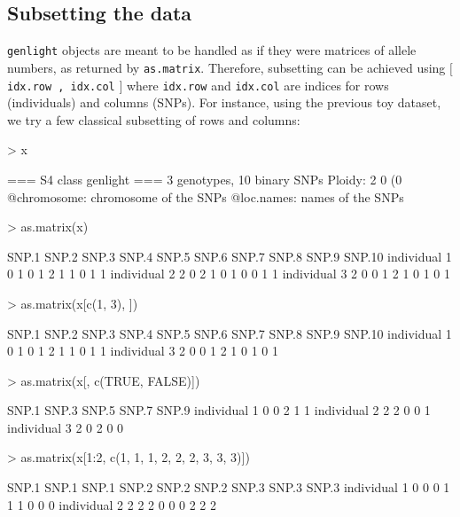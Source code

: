 \documentclass{article}
\begin{document}
\subsection{Subsetting the data}
\texttt{genlight} objects are meant to be handled as if they were matrices of allele numbers, as
returned by \texttt{as.matrix}.
Therefore, subsetting can be achieved using $[$ \texttt{idx.row , idx.col} $]$ where \texttt{idx.row}
and \texttt{idx.col} are indices for rows (individuals) and columns (SNPs).
For instance, using the previous toy dataset, we try a few classical subsetting of rows and columns:
\begin{Schunk}
\begin{Sinput}
> x
\end{Sinput}
\begin{Soutput}
 === S4 class genlight ===
 3 genotypes,  10 binary SNPs
 Ploidy: 2
 0 (0 %) missing data
 @chromosome: chromosome of the SNPs
 @loc.names: names of the SNPs
\end{Soutput}
\begin{Sinput}
> as.matrix(x)
\end{Sinput}
\begin{Soutput}
             SNP.1 SNP.2 SNP.3 SNP.4 SNP.5 SNP.6 SNP.7 SNP.8 SNP.9 SNP.10
individual 1     0     1     0     1     2     1     1     0     1      1
individual 2     2     0     2     1     0     1     0     0     1      1
individual 3     2     0     0     1     2     1     0     1     0      1
\end{Soutput}
\begin{Sinput}
> as.matrix(x[c(1, 3), ])
\end{Sinput}
\begin{Soutput}
             SNP.1 SNP.2 SNP.3 SNP.4 SNP.5 SNP.6 SNP.7 SNP.8 SNP.9 SNP.10
individual 1     0     1     0     1     2     1     1     0     1      1
individual 3     2     0     0     1     2     1     0     1     0      1
\end{Soutput}
\begin{Sinput}
> as.matrix(x[, c(TRUE, FALSE)])
\end{Sinput}
\begin{Soutput}
             SNP.1 SNP.3 SNP.5 SNP.7 SNP.9
individual 1     0     0     2     1     1
individual 2     2     2     0     0     1
individual 3     2     0     2     0     0
\end{Soutput}
\begin{Sinput}
> as.matrix(x[1:2, c(1, 1, 1, 2, 2, 2, 3, 3, 3)])
\end{Sinput}
\begin{Soutput}
             SNP.1 SNP.1 SNP.1 SNP.2 SNP.2 SNP.2 SNP.3 SNP.3 SNP.3
individual 1     0     0     0     1     1     1     0     0     0
individual 2     2     2     2     0     0     0     2     2     2
\end{Soutput}
\end{Schunk}
\end{document}
